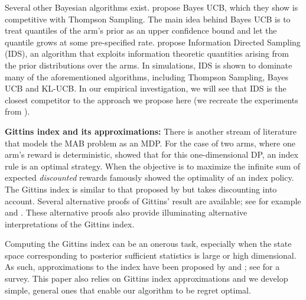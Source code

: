 Several other Bayesian algorithms exist. \cite{kaufmann2012thompson} propose Bayes UCB, which they show is competitive with Thompson Sampling. The main idea behind Bayes UCB is to treat quantiles of the arm's prior as an upper confidence bound and let the quantile grows at some pre-specified rate. \cite{russo2014learning} propose Information Directed Sampling (IDS), an algorithm that exploits information theoretic quantities arising from the prior distributions over the arms. In simulations, IDS is shown to dominate many of the aforementioned algorithms, including Thompson Sampling, Bayes UCB and KL-UCB. In our empirical investigation, we will see that IDS is the closest competitor to the approach we propose here (we recreate the experiments from \cite{russo2014learning}).

\noindent\textbf{\textsf{Gittins index and its approximations: }}
There is another stream of literature that models the MAB problem as an MDP. For the case of two arms, where one arm's reward is deterministic, \cite{bradt1956sequential} showed that for this one-dimensional DP, an index rule is an optimal strategy. When the objective is to maximize the infinite sum of expected \emph{discounted} rewards \cite{gittins1979bandit} famously showed the optimality of an index policy. The Gittins index is similar to that proposed by \cite{bradt1956sequential} but takes discounting into account. Several alternative proofs of Gittins' result are available; see for example \citep{tsitsiklis1994short,weber1992gittins,whittle1980multi} and \citep{bertsimas1996conservation}. These alternative proofs also provide illuminating alternative interpretations of the Gittins index.  
 
Computing the Gittins index can be an onerous task, especially when the state space corresponding to posterior sufficient statistics is large or high dimensional. As such, approximations to the index have been proposed by \cite{yao2006some,katehakis1987multi} and \cite{varaiya1985extensions}; see \citep{chakravorty2013multi} for a survey. This paper also relies on Gittins index approximations and we develop simple, general ones that enable our algorithm to be regret optimal. 

